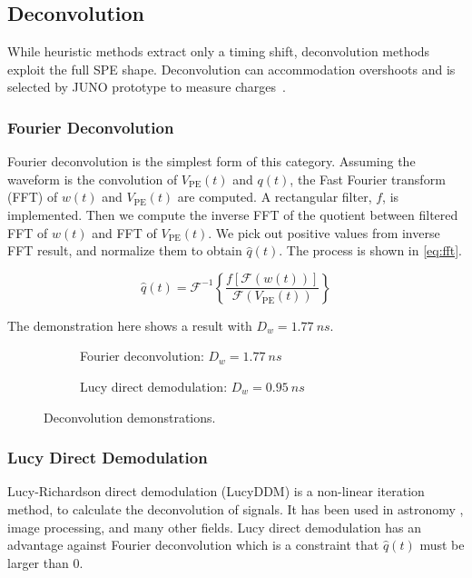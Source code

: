 \subsection{Deconvolution}
While heuristic methods extract only a timing shift, deconvolution methods exploit the full SPE shape.  Deconvolution can accommodation overshoots and is selected by JUNO prototype to measure charges~\cite{zhang_comparison_2019}.

\subsubsection{Fourier Deconvolution}

Fourier deconvolution is the simplest form of this category.  Assuming the waveform is the convolution of $V_\mathrm{PE}(t)$ and $q(t)$, the Fast Fourier transform (FFT) of $w(t)$ and $V_\mathrm{PE}(t)$ are computed. A rectangular filter, $f$, is implemented. Then we compute the inverse FFT of the quotient between filtered FFT of $w(t)$ and FFT of $V_\mathrm{PE}(t)$. We pick out positive values from inverse FFT result, and normalize them to obtain $\hat{q}(t)$. The process is shown in \eqref{eq:fft}. 

\begin{equation}
    \hat{q}(t) = \mathcal{F}^{-1}\left\{\frac{f[\mathcal{F}(w(t))]}{\mathcal{F}(V_\mathrm{PE}(t))}\right\}
    \label{eq:fft}
\end{equation}

The demonstration here shows a result with $D_w = \SI{1.77}{ns}$. 

\begin{figure}[H]
  \begin{subfigure}{0.5\textwidth}
    \centering
    \scalebox{0.36}{}
    \caption{Fourier deconvolution: $D_w = \SI{1.77}{ns}$}
  \end{subfigure}
  \begin{subfigure}{0.5\textwidth}
    \centering
    \scalebox{0.36}{}
    \caption{Lucy direct demodulation: $D_w = \SI{0.95}{ns}$}
  \end{subfigure}
  \caption{Deconvolution demonstrations.}
\end{figure}


\subsubsection{Lucy Direct Demodulation}

Lucy-Richardson direct demodulation (LucyDDM) is a non-linear iteration method, to calculate the deconvolution of signals. It has been used in astronomy \cite{li_richardson-lucy_2019}, image processing, and many other fields. Lucy direct demodulation has an advantage against Fourier deconvolution which is a constraint that $\hat{q}(t)$ must be larger than 0. 

